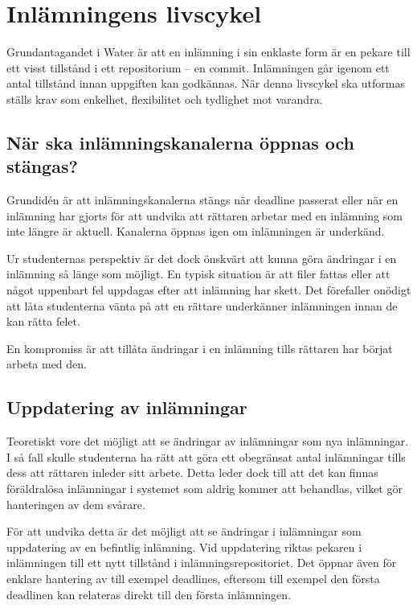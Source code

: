 \section{Inlämningens livscykel}

Grundantagandet i Water är att en inlämning i sin enklaste form är en pekare till ett visst tillstånd i ett repositorium – en commit. Inlämningen går igenom ett antal tillstånd innan uppgiften kan godkännas. När denna livscykel ska utformas ställs krav som enkelhet, flexibilitet och tydlighet mot varandra.

\subsection{När ska inlämningskanalerna öppnas och stängas?}
Grundidén är att inlämningskanalerna stängs när deadline passerat eller när en inlämning har gjorts för att undvika att rättaren arbetar med en inlämning som inte längre är aktuell. Kanalerna öppnas igen om inlämningen är underkänd.

Ur studenternas perspektiv är det dock önskvärt att kunna göra ändringar i en inlämning så länge som möjligt. En typisk situation är att filer fattas eller att något uppenbart fel uppdagas efter att inlämning har skett. Det förefaller onödigt att låta studenterna vänta på att en rättare underkänner inlämningen innan de kan rätta felet.

En kompromiss är att tillåta ändringar i en inlämning tills rättaren har börjat arbeta med den. 

\subsection{Uppdatering av inlämningar}\label{sec:uppdatering-inlamningar}
Teoretiskt vore det möjligt att se ändringar av inlämningar som nya inlämningar. I så fall skulle studenterna ha rätt att göra ett obegränsat antal inlämningar tills dess att rättaren inleder sitt arbete. Detta leder dock till att det kan finnas föräldralösa inlämningar i systemet som aldrig kommer att behandlas, vilket gör hanteringen av dem svårare.

För att undvika detta är det möjligt att se ändringar i inlämningar som uppdatering av en befintlig inlämning. Vid uppdatering riktas pekaren i inlämningen till ett nytt tillstånd i inlämningsrepositoriet. Det öppnar även för enklare hantering av till exempel deadlines, eftersom till exempel den första deadlinen kan relateras direkt till den första inlämningen.

